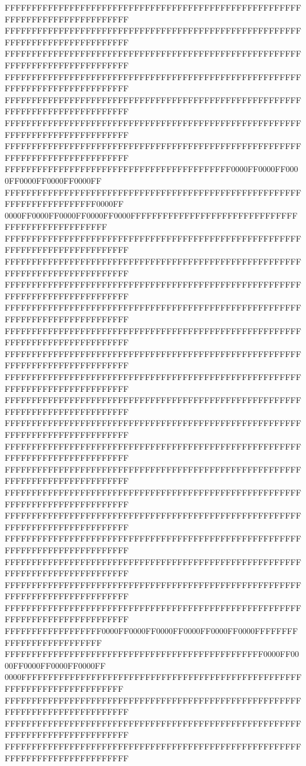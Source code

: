 FFFFFFFFFFFFFFFFFFFFFFFFFFFFFFFFFFFFFFFFFFFFFFFFFFFFFFFFFFFFFFFFFFFFFFFFFFFFFF
FFFFFFFFFFFFFFFFFFFFFFFFFFFFFFFFFFFFFFFFFFFFFFFFFFFFFFFFFFFFFFFFFFFFFFFFFFFFFF
FFFFFFFFFFFFFFFFFFFFFFFFFFFFFFFFFFFFFFFFFFFFFFFFFFFFFFFFFFFFFFFFFFFFFFFFFFFFFF
FFFFFFFFFFFFFFFFFFFFFFFFFFFFFFFFFFFFFFFFFFFFFFFFFFFFFFFFFFFFFFFFFFFFFFFFFFFFFF
FFFFFFFFFFFFFFFFFFFFFFFFFFFFFFFFFFFFFFFFFFFFFFFFFFFFFFFFFFFFFFFFFFFFFFFFFFFFFF
FFFFFFFFFFFFFFFFFFFFFFFFFFFFFFFFFFFFFFFFFFFFFFFFFFFFFFFFFFFFFFFFFFFFFFFFFFFFFF
FFFFFFFFFFFFFFFFFFFFFFFFFFFFFFFFFFFFFFFFFFFFFFFFFFFFFFFFFFFFFFFFFFFFFFFFFFFFFF
FFFFFFFFFFFFFFFFFFFFFFFFFFFFFFFFFFFFFFFFFF0000FF0000FF0000FF0000FF0000FF0000FF
FFFFFFFFFFFFFFFFFFFFFFFFFFFFFFFFFFFFFFFFFFFFFFFFFFFFFFFFFFFFFFFFFFFFFFFF0000FF
0000FF0000FF0000FF0000FF0000FFFFFFFFFFFFFFFFFFFFFFFFFFFFFFFFFFFFFFFFFFFFFFFFFF
FFFFFFFFFFFFFFFFFFFFFFFFFFFFFFFFFFFFFFFFFFFFFFFFFFFFFFFFFFFFFFFFFFFFFFFFFFFFFF
FFFFFFFFFFFFFFFFFFFFFFFFFFFFFFFFFFFFFFFFFFFFFFFFFFFFFFFFFFFFFFFFFFFFFFFFFFFFFF
FFFFFFFFFFFFFFFFFFFFFFFFFFFFFFFFFFFFFFFFFFFFFFFFFFFFFFFFFFFFFFFFFFFFFFFFFFFFFF
FFFFFFFFFFFFFFFFFFFFFFFFFFFFFFFFFFFFFFFFFFFFFFFFFFFFFFFFFFFFFFFFFFFFFFFFFFFFFF
FFFFFFFFFFFFFFFFFFFFFFFFFFFFFFFFFFFFFFFFFFFFFFFFFFFFFFFFFFFFFFFFFFFFFFFFFFFFFF
FFFFFFFFFFFFFFFFFFFFFFFFFFFFFFFFFFFFFFFFFFFFFFFFFFFFFFFFFFFFFFFFFFFFFFFFFFFFFF
FFFFFFFFFFFFFFFFFFFFFFFFFFFFFFFFFFFFFFFFFFFFFFFFFFFFFFFFFFFFFFFFFFFFFFFFFFFFFF
FFFFFFFFFFFFFFFFFFFFFFFFFFFFFFFFFFFFFFFFFFFFFFFFFFFFFFFFFFFFFFFFFFFFFFFFFFFFFF
FFFFFFFFFFFFFFFFFFFFFFFFFFFFFFFFFFFFFFFFFFFFFFFFFFFFFFFFFFFFFFFFFFFFFFFFFFFFFF
FFFFFFFFFFFFFFFFFFFFFFFFFFFFFFFFFFFFFFFFFFFFFFFFFFFFFFFFFFFFFFFFFFFFFFFFFFFFFF
FFFFFFFFFFFFFFFFFFFFFFFFFFFFFFFFFFFFFFFFFFFFFFFFFFFFFFFFFFFFFFFFFFFFFFFFFFFFFF
FFFFFFFFFFFFFFFFFFFFFFFFFFFFFFFFFFFFFFFFFFFFFFFFFFFFFFFFFFFFFFFFFFFFFFFFFFFFFF
FFFFFFFFFFFFFFFFFFFFFFFFFFFFFFFFFFFFFFFFFFFFFFFFFFFFFFFFFFFFFFFFFFFFFFFFFFFFFF
FFFFFFFFFFFFFFFFFFFFFFFFFFFFFFFFFFFFFFFFFFFFFFFFFFFFFFFFFFFFFFFFFFFFFFFFFFFFFF
FFFFFFFFFFFFFFFFFFFFFFFFFFFFFFFFFFFFFFFFFFFFFFFFFFFFFFFFFFFFFFFFFFFFFFFFFFFFFF
FFFFFFFFFFFFFFFFFFFFFFFFFFFFFFFFFFFFFFFFFFFFFFFFFFFFFFFFFFFFFFFFFFFFFFFFFFFFFF
FFFFFFFFFFFFFFFFFFFFFFFFFFFFFFFFFFFFFFFFFFFFFFFFFFFFFFFFFFFFFFFFFFFFFFFFFFFFFF
FFFFFFFFFFFFFFFFFF0000FF0000FF0000FF0000FF0000FF0000FFFFFFFFFFFFFFFFFFFFFFFFFF
FFFFFFFFFFFFFFFFFFFFFFFFFFFFFFFFFFFFFFFFFFFFFFFF0000FF0000FF0000FF0000FF0000FF
0000FFFFFFFFFFFFFFFFFFFFFFFFFFFFFFFFFFFFFFFFFFFFFFFFFFFFFFFFFFFFFFFFFFFFFFFFFF
FFFFFFFFFFFFFFFFFFFFFFFFFFFFFFFFFFFFFFFFFFFFFFFFFFFFFFFFFFFFFFFFFFFFFFFFFFFFFF
FFFFFFFFFFFFFFFFFFFFFFFFFFFFFFFFFFFFFFFFFFFFFFFFFFFFFFFFFFFFFFFFFFFFFFFFFFFFFF
FFFFFFFFFFFFFFFFFFFFFFFFFFFFFFFFFFFFFFFFFFFFFFFFFFFFFFFFFFFFFFFFFFFFFFFFFFFFFF
